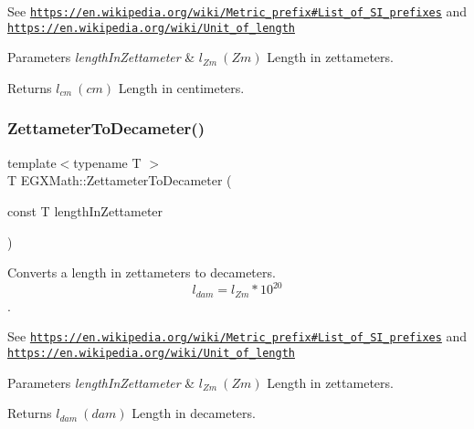 See \href{https://en.wikipedia.org/wiki/Metric_prefix#List_of_SI_prefixes}{\tt https\+://en.\+wikipedia.\+org/wiki/\+Metric\+\_\+prefix\#\+List\+\_\+of\+\_\+\+S\+I\+\_\+prefixes} and \href{https://en.wikipedia.org/wiki/Unit_of_length}{\tt https\+://en.\+wikipedia.\+org/wiki/\+Unit\+\_\+of\+\_\+length} 
\begin{DoxyParams}{Parameters}
{\em length\+In\+Zettameter} & $ l_{Zm}\ (Zm)$ Length in zettameters. \\
\hline
\end{DoxyParams}
\begin{DoxyReturn}{Returns}
$ l_{cm}\ (cm)$ Length in centimeters. 
\end{DoxyReturn}
\mbox{\label{group___e_g_x_math-_conversions-_length_conversions-_zettameter-_s_i_ga3346f705d6a1e23f103456886cfca420}} 
\subsubsection{\texorpdfstring{Zettameter\+To\+Decameter()}{ZettameterToDecameter()}}
{\footnotesize\ttfamily template$<$typename T $>$ \\
T E\+G\+X\+Math\+::\+Zettameter\+To\+Decameter (\begin{DoxyParamCaption}\item[{const T}]{length\+In\+Zettameter }\end{DoxyParamCaption})}



Converts a length in zettameters to decameters. \[ l_{dam}=l_{Zm} * 10^{20} \]. 

See \href{https://en.wikipedia.org/wiki/Metric_prefix#List_of_SI_prefixes}{\tt https\+://en.\+wikipedia.\+org/wiki/\+Metric\+\_\+prefix\#\+List\+\_\+of\+\_\+\+S\+I\+\_\+prefixes} and \href{https://en.wikipedia.org/wiki/Unit_of_length}{\tt https\+://en.\+wikipedia.\+org/wiki/\+Unit\+\_\+of\+\_\+length} 
\begin{DoxyParams}{Parameters}
{\em length\+In\+Zettameter} & $ l_{Zm}\ (Zm)$ Length in zettameters. \\
\hline
\end{DoxyParams}
\begin{DoxyReturn}{Returns}
$ l_{dam}\ (dam)$ Length in decameters. 
\end{DoxyReturn}
\mbox{\label{group___e_g_x_math-_conversions-_length_conversions-_zettameter-_s_i_gadee88d17dc42d5a94ff2bbb0dfe05a71}} 
